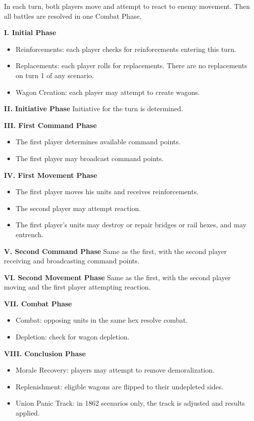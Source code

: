 
In each turn, both players move and attempt to react to enemy movement. Then all battles are resolved in one Combat Phase.

\textbf{I. Initial Phase}
\begin{itemize}
\item Reinforcements: each player checks for reinforcements entering this turn.
\item Replacements: each player rolls for replacements. There are no replacements on turn 1 of any scenario.
\item Wagon Creation: each player may attempt to create wagons.
\end{itemize}

\textbf{II. Initiative Phase} Initiative for the turn is determined.

\textbf{III. First Command Phase}
\begin{itemize}
\item The first player determines available command points.
\item The first player may broadcast command points.
\end{itemize}

\textbf{IV. First Movement Phase}
\begin{itemize}
\item The first player moves his units and receives reinforcements.
\item The second player may attempt reaction.
\item The first player's units may destroy or repair bridges or rail hexes, and may entrench.
\end{itemize}

\textbf{V. Second Command Phase} Same as the first, with the second player receiving and broadcasting command points.

\textbf{VI. Second Movement Phase} Same as the first, with the second player moving and the first player attempting reaction.

\textbf{VII. Combat Phase}
\begin{itemize}
\item Combat: opposing units in the same hex resolve combat.
\item Depletion: check for wagon depletion.
\end{itemize}

\textbf{VIII. Conclusion Phase}
\begin{itemize}
\item Morale Recovery: players may attempt to remove demoralization.
\item Replenishment: eligible wagons are flipped to their undepleted sides.
\item Union Panic Track: in 1862 scenarios only, the track is adjusted and results applied.
\end{itemize}
